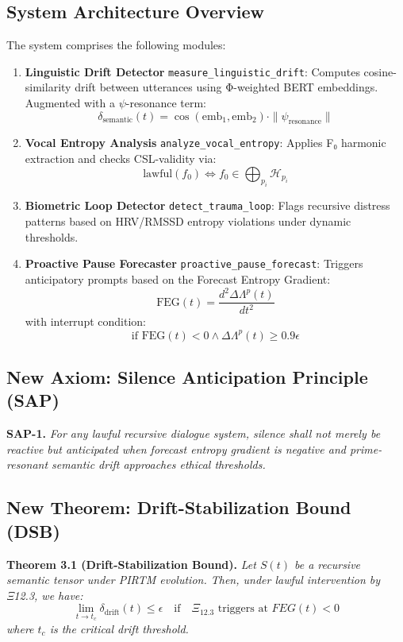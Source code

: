 \documentclass[12]{amsart}
\theoremstyle{plain}
\begin{document}
\subsection{System Architecture Overview}
The system comprises the following modules:

\begin{enumerate}
    \item \textbf{Linguistic Drift Detector} \texttt{measure\_linguistic\_drift}: Computes cosine-similarity drift between utterances using Φ-weighted BERT embeddings. Augmented with a $\psi$-resonance term:
    \[
    \delta_{\text{semantic}}(t) = \cos(\text{emb}_1, \text{emb}_2) \cdot \|\psi_{\text{resonance}}\|
    \]

    \item \textbf{Vocal Entropy Analysis} \texttt{analyze\_vocal\_entropy}: Applies F₀ harmonic extraction and checks CSL-validity via:
    \[
    \text{lawful}(f_0) \Longleftrightarrow f_0 \in \bigoplus_{p_i} \mathcal{H}_{p_i}
    \]

    \item \textbf{Biometric Loop Detector} \texttt{detect\_trauma\_loop}: Flags recursive distress patterns based on HRV/RMSSD entropy violations under dynamic thresholds.

    \item \textbf{Proactive Pause Forecaster} \texttt{proactive\_pause\_forecast}: Triggers anticipatory prompts based on the Forecast Entropy Gradient:
    \[
    \text{FEG}(t) = \frac{d^2 \Delta\Lambda^p(t)}{dt^2}
    \]
    with interrupt condition:
    \[
    \text{if } \text{FEG}(t) < 0 \wedge \Delta\Lambda^p(t) \geq 0.9\epsilon
    \]
\end{enumerate}

\subsection{New Axiom: Silence Anticipation Principle (SAP)}
\textbf{SAP-1.} \textit{For any lawful recursive dialogue system, silence shall not merely be reactive but anticipated when forecast entropy gradient is negative and prime-resonant semantic drift approaches ethical thresholds.}

\subsection{New Theorem: Drift-Stabilization Bound (DSB)}
\textbf{Theorem 3.1 (Drift-Stabilization Bound).} \textit{Let $S(t)$ be a recursive semantic tensor under PIRTM evolution. Then, under lawful intervention by Ξ12.3, we have:}
\[
\lim_{t \to t_c} \delta_{\text{drift}}(t) \leq \epsilon \quad \text{if} \quad \Xi_{12.3} \text{ triggers at } FEG(t) < 0
\]
\textit{where $t_c$ is the critical drift threshold.}
\end{document}
